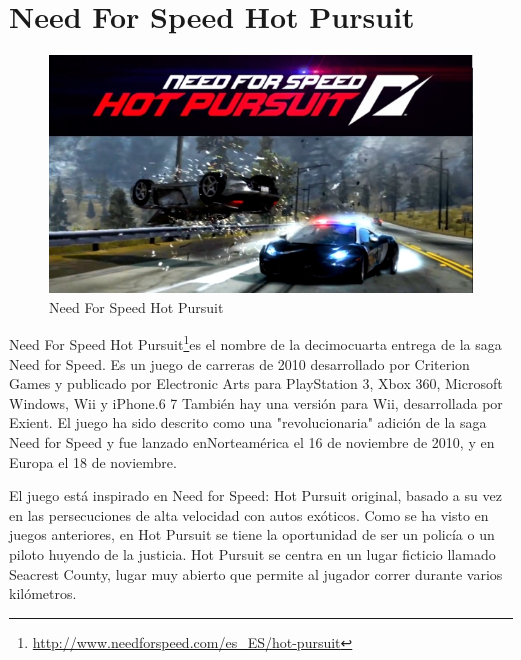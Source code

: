 \section{Need For Speed Hot Pursuit}

\begin{figure}[htbp]
\begin{center}
\includegraphics[width=.60\textwidth]{./imagenes/NeedForSpeedHotPursuit.jpg}
\caption{Need For Speed Hot Pursuit}
\label{Need For Speed Hot Pursuit}
\end{center}
\end{figure}

Need For Speed Hot Pursuit\footnote{\url{http://www.needforspeed.com/es_ES/hot-pursuit}}es el nombre de la decimocuarta entrega de la saga Need for Speed. Es un juego de carreras de 2010 desarrollado por Criterion Games y publicado por Electronic Arts para PlayStation 3, Xbox 360, Microsoft Windows, Wii y iPhone.6 7 También hay una versión para Wii, desarrollada por Exient. El juego ha sido descrito como una "revolucionaria" adición de la saga Need for Speed y fue lanzado enNorteamérica el 16 de noviembre de 2010, y en Europa el 18 de noviembre.

El juego está inspirado en Need for Speed: Hot Pursuit original, basado a su vez en las persecuciones de alta velocidad con autos exóticos. Como se ha visto en juegos anteriores, en Hot Pursuit se tiene la oportunidad de ser un policía o un piloto huyendo de la justicia. Hot Pursuit se centra en un lugar ficticio llamado Seacrest County, lugar muy abierto que permite al jugador correr durante varios kilómetros.

